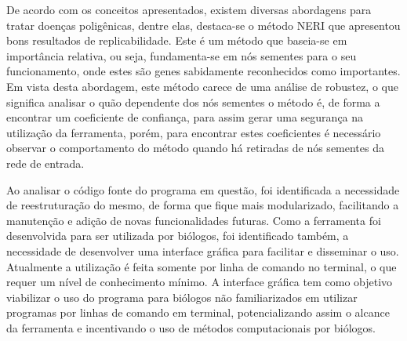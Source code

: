 De acordo com os conceitos apresentados, existem diversas abordagens para tratar doenças poligênicas, dentre elas, destaca-se o método NERI \cite{Simoes2015} que apresentou bons resultados de replicabilidade. Este é um método que baseia-se em importância relativa, ou seja, fundamenta-se em nós sementes para o seu funcionamento, onde estes são genes sabidamente reconhecidos como importantes. Em vista desta abordagem, este método carece de uma análise de robustez, o que significa analisar o quão dependente dos nós sementes o método é, de forma a encontrar um coeficiente de confiança, para assim gerar uma segurança na utilização da ferramenta, porém, para encontrar estes coeficientes é necessário observar o comportamento do método quando há retiradas de nós sementes da rede de entrada.

Ao analisar o código fonte do programa em questão, foi identificada a necessidade de reestruturação do mesmo, de forma que fique mais modularizado, facilitando a manutenção e adição de novas funcionalidades futuras. 
%
Como a ferramenta foi desenvolvida para ser utilizada por biólogos, foi identificado também, a necessidade de desenvolver uma interface gráfica para facilitar e disseminar o uso.
Atualmente a utilização é feita somente por linha de comando no terminal, o que requer um nível de conhecimento mínimo. A interface gráfica tem como objetivo viabilizar o uso do programa para biólogos não familiarizados em utilizar programas por linhas de comando em terminal, potencializando assim o alcance da ferramenta e incentivando o uso de métodos computacionais por biólogos.









